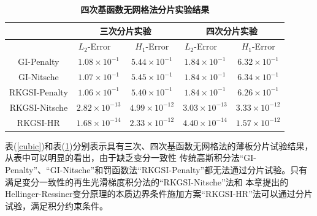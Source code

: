 \begin{table}[H]
    \caption{\textbf{四次基函数无网格法分片实验结果}}
    \centering\label{quartic}
   \begin{tabular}{ccccc}
   \toprule
   $\quad$&\multicolumn{2}{c}{三次分片实验}&\multicolumn{2}{c}{四次分片实验}\\
   \midrule
   &$L_2$-Error$\quad$&$H_1$-Error&$L_2$-Error$\quad$&$H_1$-Error\\
   \midrule
   GI-Penalty&$1.08\times10^{-1}$&$5.44\times10^{-1}$&$1.84\times10^{-1}$&$6.32\times10^{-1}$\\
   GI-Nitsche&$1.07\times10^{-1}$&$5.45\times10^{-1}$&$1.84\times10^{-1}$&$6.34\times10^{-1}$\\
  RKGSI-Penalty&$1.06\times10^{-1}$&$5.40\times10^{-1}$&$1.84\times10^{-1}$&$6.26\times10^{-1}$\\
  RKGSI-Nitsche&$2.82\times10^{-13}$&$4.99\times10^{-12}$&$3.03\times10^{-13}$&$3.33\times10^{-12}$\\
  RKGSI-HR&$1.68\times10^{-14}$&$2.33\times10^{-12}$&$4.40\times10^{-14}$&$1.57\times10^{-12}$\\
\bottomrule
\end{tabular}
\end{table}\par
表(\ref{cubic})和表(\ref{quartic})分别表示具有三次、四次基函数无网格法的薄板分片试验结果，从表中可以明显的看出，由于缺乏变分一致性
传统高斯积分法“GI-Penalty”、“GI-Nitsche”和罚函数法“RKGSI-Penalty”都无法通过分片试验。只有满足变分一致性的再生光滑梯度积分法的“RKGSI-Nitsche”法和
本章提出的Hellinger-Ressiner变分原理的本质边界条件施加方案“RKGSI-HR”法可以通过分片试验，满足积分约束条件。
